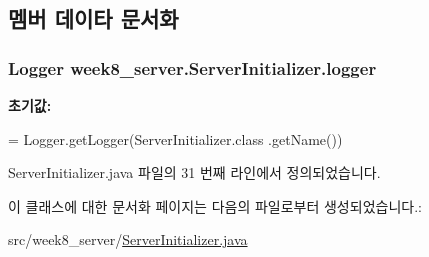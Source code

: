 \subsection{멤버 데이타 문서화}
\hypertarget{classweek8__server_1_1_server_initializer_a93ccaaf656ba68e2dd3950bacc0e9b2e}{
\subsubsection[{logger}]{\setlength{\rightskip}{0pt plus 5cm}Logger week8\-\_\-server.\-Server\-Initializer.\-logger\hspace{0.3cm}{\ttfamily [static]}}}\label{classweek8__server_1_1_server_initializer_a93ccaaf656ba68e2dd3950bacc0e9b2e}
{\bfseries 초기값\-:}
\begin{DoxyCode}
= Logger.getLogger(ServerInitializer.class
            .getName())
\end{DoxyCode}


Server\-Initializer.\-java 파일의 31 번째 라인에서 정의되었습니다.



이 클래스에 대한 문서화 페이지는 다음의 파일로부터 생성되었습니다.\-:\begin{DoxyCompactItemize}
\item 
src/week8\-\_\-server/\hyperlink{_server_initializer_8java}{Server\-Initializer.\-java}\end{DoxyCompactItemize}
